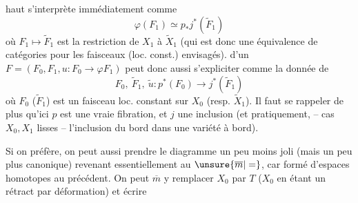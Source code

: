 %
haut s'interprète immédiatement comme
\[
\varphi(F_1)\simeq p_*j^*(\widetilde F_1)
\]
où $F_1\mapsto\widetilde F_1$ est la restriction de $X_1$ à $\widetilde X_1$
(qui est donc une équivalence de catégories pour les faisceaux (loc. const.) envisagés).
 d'un
$F=(F_0,F_1,u:F_0\to\varphi F_1)$ peut donc aussi
s'expliciter comme la donnée de
\[
F_0,\ \widetilde F_1,\ \widetilde u:p^*(F_0)\longrightarrow j^*(\widetilde F_1)
\]
où $F_0$ ($\widetilde F_1$) est un faisceau loc. constant sur
$X_0$ (resp. $\widetilde X_1$). Il faut se rappeler de plus
qu'ici $p$ est une vraie fibration, et $j$ une inclusion
(et pratiquement, -- cas $X_0,X_1$ lisses --
 l'inclusion du bord dans une variété à bord).

Si on préfère, on peut aussi prendre le diagramme un peu moins joli
(mais un peu plus canonique)
revenant essentiellement au $\unsure{\overline m|=}$, car formé d'espaces
homotopes au précédent. On peut $\overline m$ y remplacer
$X_0$ par $T$ ($X_0$ en étant un rétract par déformation) et écrire
